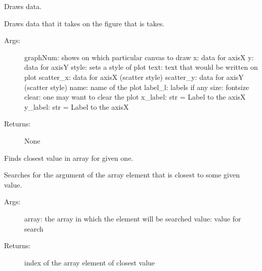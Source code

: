 \documentclass[letterpaper,10pt,english]{sphinxmanual}
\begin{document}

\begin{fulllineitems}
\label{\detokenize{GUI:GUI.draw_data}}
Draws data.

Draws data that it takes on the figure that is takes.
\begin{description}
\item[{Args:}] \leavevmode
graphNum: shows on which particular canvas to draw
x: data for axis\sphinxhyphen{}X
y: data for axis\sphinxhyphen{}Y
style: sets a style of plot
text: text that would be written on plot
scatter\_x: data for axis\sphinxhyphen{}X (scatter style)
scatter\_y: data for axis\sphinxhyphen{}Y (scatter style)
name: name of the plot
label\_l: labels if any
size: fontsize
clear: one may want to clear the plot
x\_label: str = Label to the axis\sphinxhyphen{}X
y\_label: str = Label to the axis\sphinxhyphen{}X

\item[{Returns:}] \leavevmode
None

\end{description}

\end{fulllineitems}


\begin{fulllineitems}
\label{\detokenize{GUI:GUI.find_nearest}}
Finds closest value in array for given one.

Searches for the argument of the array element that is closest to some given value.
\begin{description}
\item[{Args:}] \leavevmode
array: the array in which the element will be searched
value: value for search

\item[{Returns:}] \leavevmode
index of the array element of closest value

\end{description}

\end{fulllineitems}
\end{document}
